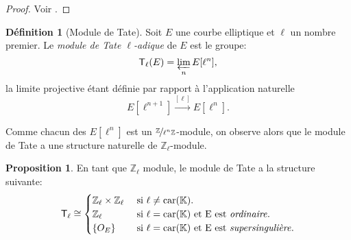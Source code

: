 \documentclass[10pt,a4paper]{book}
\theoremstyle{plain}
\theoremstyle{definition}
\theoremstyle{definition}
\theoremstyle{definition}
\newtheorem{prop}[thm]{Proposition}
\theoremstyle{definition}
\newtheorem{defi}[thm]{Définition}
\theoremstyle{remark}
\theoremstyle{remark}
\theoremstyle{definition}
\begin{document}
\begin{proof}
Voir \cite[Corrolary III.6.4]{Silv1}.
\end{proof}


\begin{defi}[Module de Tate]
Soit $E$ une courbe elliptique et $\ell$ un nombre premier. Le \emph{module de Tate $\ell$-adique} de $E$ est le groupe:
\begin{equation*}
\mathsf{T}_{\ell}(E)=\varprojlim_nE[\ell^n],
\end{equation*}
la limite projective étant définie par rapport à l'application naturelle
\begin{equation*}
E[\ell^{n+1}] \overset{[\ell]}{\rightarrow} E[\ell^n].
\end{equation*}
\end{defi}
Comme chacun des $E[\ell^n]$ est un $\nicefrac{\mathbb{Z}}{\ell^n\mathbb{Z}}$-module, on observe alors que le module de Tate a une structure naturelle de $\mathbb{Z}_{\ell}$-module.
\begin{prop}
En tant que $\mathbb{Z}_{\ell}$ module, le module de Tate a la structure suivante:
\begin{equation*}
\mathsf{T}_{\ell} \cong 
\begin{cases} 
\mathbb{Z}_{\ell} \times \mathbb{Z}_{\ell} &\text{ si } \ell \neq \mathrm{car}(\mathbb{K}). \\
\mathbb{Z}_{\ell} &\text{ si } \ell=\mathrm{car}(\mathbb{K})  \text{ et E est \emph{ordinaire}}. \\
\{O_E\} &\text{ si } \ell=\mathrm{car}(\mathbb{K})  \text{ et E est \emph{supersingulière}}.
\end{cases}
\end{equation*}
\end{prop}

\end{document}
